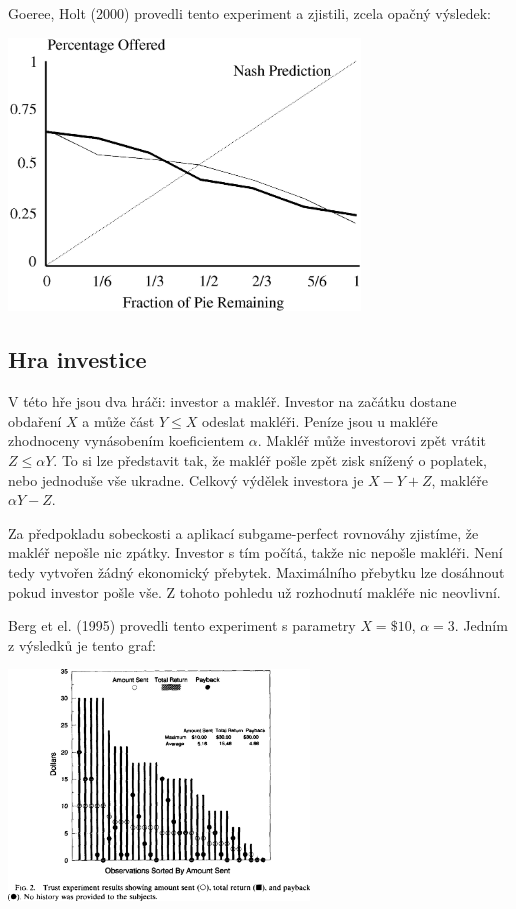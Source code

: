 \documentclass[a5paper,12pt]{article}
\begin{document}
      Goeree, Holt (2000) provedli tento experiment a zjistili, zcela opačný výsledek:\\
      \begin{center}
        \includegraphics[width=0.7\textwidth]{holt.png}
      \end{center}

    \subsection{Hra investice}
      V této hře jsou dva hráči: investor a makléř. Investor na začátku dostane obdaření $X$ a může část $Y\leq X$
      odeslat makléři. Peníze jsou u makléře zhodnoceny vynásobením koeficientem $\alpha$. Makléř může investorovi
      zpět vrátit $Z\leq\alpha Y$. To si lze představit tak, že makléř pošle zpět zisk snížený o poplatek, nebo
      jednoduše vše ukradne. Celkový výdělek investora je $X-Y+Z$, makléře $\alpha Y-Z$.

      Za předpokladu sobeckosti a aplikací subgame-perfect rovnováhy zjistíme, že makléř nepošle nic zpátky. Investor
      s tím počítá, takže nic nepošle makléři. Není tedy vytvořen žádný ekonomický přebytek. Maximálního přebytku lze
      dosáhnout pokud investor pošle vše. Z tohoto pohledu už rozhodnutí makléře nic neovlivní.

      Berg et el. (1995) provedli tento experiment s parametry $X=\$10$, $\alpha=3$. Jedním z výsledků je tento graf:

      \begin{center}
        \includegraphics[width=0.6\textwidth]{berg.png}
      \end{center}
\end{document}
